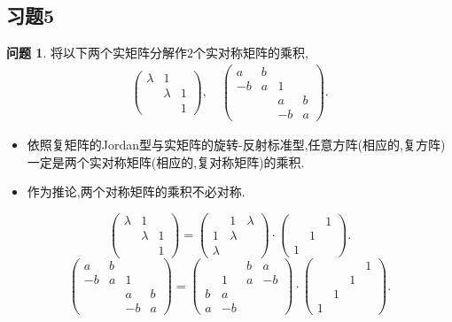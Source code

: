 \documentclass[11pt]{ctexart}
\theoremstyle{definition}
\newtheorem{qqq}{问题}[section]
\numberwithin{equation}{section}
\begin{document}
\subsection{习题5}
\begin{qqq}
    将以下两个实矩阵分解作$2$个实对称矩阵的乘积,
    \begin{align}
        \begin{pmatrix}
            \lambda&1&\\&\lambda&1\\&&1
        \end{pmatrix},\quad
        \begin{pmatrix}
            a&b& & \\-b&a&1& \\ & &a&b\\ & & -b &a
        \end{pmatrix}.
    \end{align}
    \begin{itemize}
        \item 依照复矩阵的Jordan型与实矩阵的旋转-反射标准型,任意方阵(相应的,复方阵)一定是两个实对称矩阵(相应的,复对称矩阵)的乘积.
        \item 作为推论,两个对称矩阵的乘积不必对称.
    \end{itemize}
\end{qqq}
\begin{aaa}
    $$\begin{pmatrix}
        \lambda&1&\\&\lambda&1\\&&1
    \end{pmatrix}=\begin{pmatrix}
        &1&\lambda\\1&\lambda&\\\lambda&&
    \end{pmatrix}\cdot \begin{pmatrix}
        &&1\\ &1&\\1&&
    \end{pmatrix}.$$
    $$\begin{pmatrix}
        a&b& & \\-b&a&1& \\ & &a&b\\ & & -b &a
    \end{pmatrix}=\begin{pmatrix}
        &&b&a\\ &1&a&-b\\b&a&&\\a&-b&&
    \end{pmatrix}\cdot \begin{pmatrix}
        &&&1\\&&1& \\&1&&\\1&&&    \end{pmatrix}.$$
\end{aaa}
\end{document}
